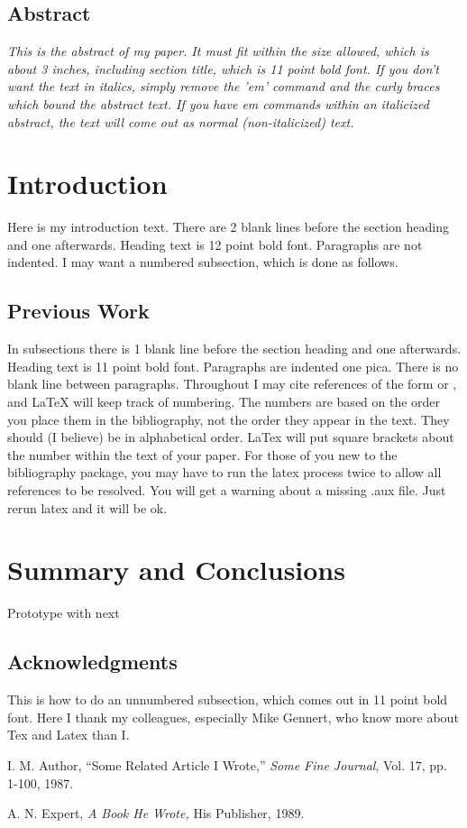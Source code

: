 \subsection*{\centering Abstract}
{\em
This is the abstract of my paper.  It must fit within the 
size allowed, which is about 3 inches, including section 
title, which is 11 point bold font.  If you don't want 
the text in italics, simply remove the 'em' command and 
the curly braces which bound the abstract text.  If you 
have em commands within an italicized abstract, the text 
will come out as normal (non-italicized) text. 
}

\section{Introduction}
Here is my introduction text.  There are 2 blank lines 
before the section heading and one afterwards.  Heading 
text is 12 point bold font.  Paragraphs are not indented. 
I may want a numbered subsection, which is done as 
follows.

\subsection{Previous Work}
In subsections there is 1 blank line before the section 
heading and one afterwards.  Heading text is 11 point 
bold font.  Paragraphs are indented one pica.  There is 
no blank line between paragraphs.
Throughout I may cite references of the form 
\cite{key:foo} or \cite{foo:baz}, and LaTeX will keep 
track of numbering.  The numbers are based on the order 
you place them in the bibliography, not the order they 
appear in the text.  They should (I believe) be in 
alphabetical order.  LaTex will put square brackets about 
the number within the text of your paper.  For those of 
you new to the bibliography package, you may have to run 
the latex process twice to allow all references to be 
resolved. You will get a warning about a missing .aux 
file.  Just rerun latex and it will be ok.

\section{Summary and Conclusions}
Prototype with next 


\subsection*{Acknowledgments}
This is how to do an unnumbered subsection, which comes 
out in 11 point bold font.  Here I thank my colleagues, 
especially Mike Gennert, who know more about Tex and 
Latex than I.

	\begin{thebibliography}{9}
	
		I. M. Author,
		``Some Related Article I Wrote,''
		{\em Some Fine Journal}, Vol. 17, pp. 1-100, 1987.
		
		A. N. Expert,
		{\em A Book He Wrote,}
		His Publisher, 1989.
	
	\end{thebibliography}




